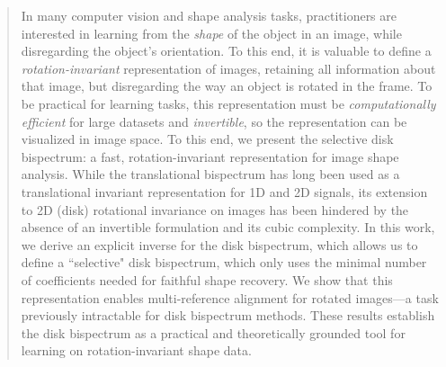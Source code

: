 \begin{abstract}
In many computer vision and shape analysis tasks, practitioners are interested in learning from the \textit{shape} of the object in an image, while disregarding the object's orientation. To this end, it is valuable to define a \textit{rotation-invariant} representation of images, retaining all information about that image, but disregarding the way an object is rotated in the frame. To be practical for learning tasks, this representation must be \textit{computationally efficient} for large datasets and \textit{invertible}, so the representation can be visualized in image space. To this end, we present the selective disk bispectrum: a fast, rotation-invariant representation for image shape analysis. While the translational bispectrum has long been used as a translational invariant representation for 1D and 2D signals, its extension to 2D (disk) rotational invariance on images has been hindered by the absence of an invertible formulation and its cubic complexity. In this work, we derive an explicit inverse for the disk bispectrum, which allows us to define a ``selective" disk bispectrum, which only uses the minimal number of coefficients needed for faithful shape recovery. We show that this representation enables multi-reference alignment for rotated images—a task previously intractable for disk bispectrum methods. These results establish the disk bispectrum as a practical and theoretically grounded tool for learning on rotation-invariant shape data.
\end{abstract}
